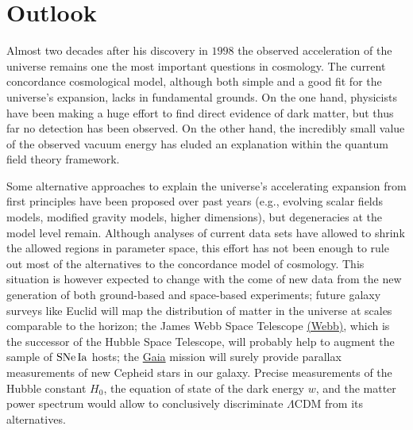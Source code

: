 \chapter{Outlook}
\label{chapter-outlook}

Almost two decades after his discovery in $1998$ the observed acceleration of the universe remains one the most important questions in cosmology. The current concordance cosmological model, although both simple and a good fit for the universe's expansion, lacks in fundamental grounds. On the one hand, physicists have been making a huge effort to find direct evidence of dark matter, but thus far no detection has been observed. On the other hand, the incredibly small value of the observed vacuum energy has eluded an explanation within the quantum field theory framework. 

Some alternative approaches to explain the universe's accelerating expansion from first principles have been proposed over past years (e.g., evolving scalar fields models, modified gravity models, higher dimensions), but degeneracies at the model level remain. Although analyses of current data sets have allowed to shrink the allowed regions in parameter space, this effort has not been enough to rule out most of the alternatives to the concordance model of cosmology. This situation is however expected to change with the come of new data from the new generation of both ground-based and space-based experiments; future galaxy surveys like Euclid will map the distribution of matter in the universe at scales comparable to the horizon; the James Webb Space Telescope \href{www.jwst.nasa.gov}{(Webb)}, which is the successor of the Hubble Space Telescope, will probably help to augment the sample of $\mathrm{SNe\,Ia}$ hosts; the \href{http://sci.esa.int/gaia/}{Gaia} mission will surely provide parallax measurements of new Cepheid stars in our galaxy. Precise measurements of the Hubble constant $H_0$, the equation of state of the dark energy $w$, and the matter power spectrum would allow to conclusively discriminate $\Lambda$CDM from its alternatives. 

